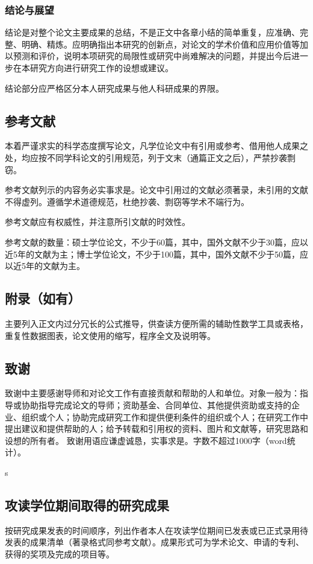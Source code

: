 \subsubsection{结论与展望}
结论是对整个论文主要成果的总结，不是正文中各章小结的简单重复，应准确、完整、明确、精炼。应明确指出本研究的创新点，对论文的学术价值和应用价值等加以预测和评价，说明本项研究的局限性或研究中尚难解决的问题，并提出今后进一步在本研究方向进行研究工作的设想或建议。

结论部分应严格区分本人研究成果与他人科研成果的界限。

\subsection{参考文献}
本着严谨求实的科学态度撰写论文，凡学位论文中有引用或参考、借用他人成果之处，均应按不同学科论文的引用规范，列于文末（通篇正文之后），严禁抄袭剽窃。

参考文献列示的内容务必实事求是。论文中引用过的文献必须著录，未引用的文献不得虚列。遵循学术道德规范，杜绝抄袭、剽窃等学术不端行为。

参考文献应有权威性，并注意所引文献的时效性。

参考文献的数量：硕士学位论文，不少于60篇，其中，国外文献不少于30篇，应以近5年的文献为主；博士学位论文，不少于100篇，其中，国外文献不少于50篇，应以近5年的文献为主。

\subsection{附录（如有）}
主要列入正文内过分冗长的公式推导，供查读方便所需的辅助性数学工具或表格，重复性数据图表，论文使用的缩写，程序全文及说明等。
\subsection{致谢}
致谢中主要感谢导师和对论文工作有直接贡献和帮助的人和单位。对象一般为：指导或协助指导完成论文的导师；资助基金、合同单位、其他提供资助或支持的企业、组织或个人；协助完成研究工作和提供便利条件的组织或个人；在研究工作中提出建议和提供帮助的人；给予转载和引用权的资料、图片和文献等，研究思路和设想的所有者。
致谢用语应谦虚诚恳，实事求是。字数不超过1000字（word统计）。

s\subsection{攻读学位期间取得的研究成果}
按研究成果发表的时间顺序，列出作者本人在攻读学位期间已发表或已正式录用待发表的成果清单（著录格式同参考文献）。成果形式可为学术论文、申请的专利、获得的奖项及完成的项目等。